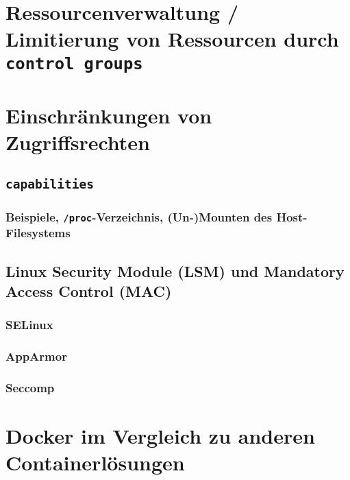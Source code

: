 \documentclass[../main.tex]{subfiles}
\begin{document}
	\section{Ressourcenverwaltung / Limitierung von Ressourcen durch \texttt{control groups}}
  \label{secResLimit}


  \section{Einschränkungen von Zugriffsrechten}
    \subsection{\texttt{capabilities}}
      \subsubsection{Beispiele, \texttt{/proc}-Verzeichnis, (Un-)Mounten des Host-Filesystems}

    \subsection{Linux Security Module (LSM) und Mandatory Access Control (MAC)}
  		\subsubsection{SELinux}
      \subsubsection{AppArmor}
      \subsubsection{Seccomp}

	\section{Docker im Vergleich zu anderen Containerlösungen}
\end{document}
